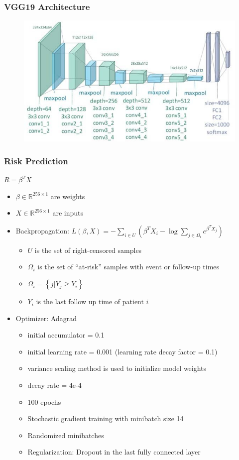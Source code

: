 \message{ !name(presentation.tex)}\documentclass[usenames,dvipsnames]{beamer}
\begin{document}
\begin{frame}
  \frametitle{VGG19 Architecture}
  \begin{figure}[ht]
    \centering
    \includegraphics[width=1.0\textwidth,keepaspectratio]{figures/vgg19.jpg}
    \caption*{\label{fig:vgg19}}
  \end{figure}
\end{frame}
\begin{frame}
  \frametitle{Risk Prediction}
  $R=\beta^{T}X$
  \begin{itemize}
    \item $\beta \in \mathbb{R}^{256 \times 1}$ are weights
    \item $X \in \mathbb{R}^{256 \times 1}$ are inputs
    \item Backpropagation:
    $L(\beta, X)=-\sum_{i \in U}\left(\beta^{T} X_{i}-\log \sum_{j \in \Omega_{i}} e^{\beta^{T} X_{j}}\right)$
    \begin{itemize}
      \item $U$ is the set of right-censored samples
      \item $\Omega_{i}$ is the set of ``at-risk'' samples with event or follow-up times
      \item $\Omega_{i}=\left\{j | Y_{j} \geq Y_{i}\right\}$
      \item $Y_{i}$ is the last follow up time of patient $i$
    \end{itemize}
    \item Optimizer: Adagrad
    \begin{itemize}
      \item initial accumulator = 0.1
      \item initial learning rate = 0.001 (learning rate decay factor = 0.1)
      \item variance scaling method is used to initialize model weights
      \item decay rate = 4e-4
      \item 100 epochs
      \item Stochastic gradient training with minibatch size 14
      \item Randomized minibatches
      \item Regularization: Dropout in the last fully connected layer
    \end{itemize}
  \end{itemize}
\end{frame}
\end{document}
